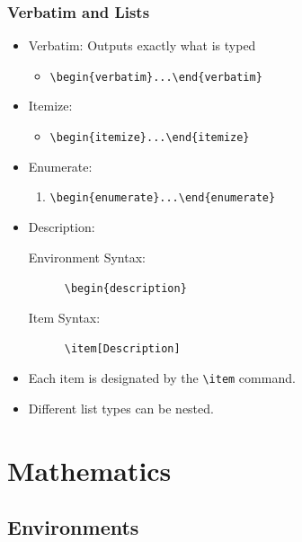 \documentclass{beamer}
\begin{document}
\begin{frame}[containsverbatim]
    \frametitle{Verbatim and Lists}
    \begin{itemize}
        \item Verbatim: Outputs exactly what is typed
        \begin{itemize}
            \item \verb|\begin{verbatim}...\end{verbatim}|
        \end{itemize}
        \item Itemize:
        \begin{itemize}
            \item \verb|\begin{itemize}...\end{itemize}|
        \end{itemize}
        \item Enumerate:
        \begin{enumerate}
            \item \verb|\begin{enumerate}...\end{enumerate}|
        \end{enumerate}
        \item Description:
        \begin{description}
            \item[Environment Syntax:]  \verb|\begin{description}|
            \item[Item Syntax:] \verb|\item[Description]|
        \end{description}
        \item Each item is designated by the \verb|\item| command.
        \item Different list types can be nested.
    \end{itemize}
\end{frame}

\section{Mathematics}

\subsection{Environments}
\end{document}
